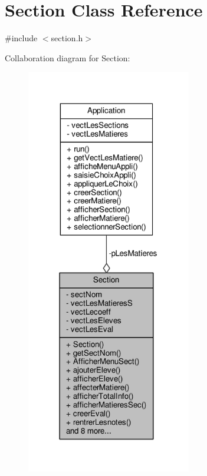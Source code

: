 \hypertarget{class_section}{\section{Section Class Reference}
\label{class_section}
}


{\ttfamily \#include $<$section.\+h$>$}



Collaboration diagram for Section\+:\nopagebreak
\begin{figure}[H]
\begin{center}
\leavevmode
\includegraphics[width=204pt]{class_section__coll__graph}
\end{center}
\end{figure}
